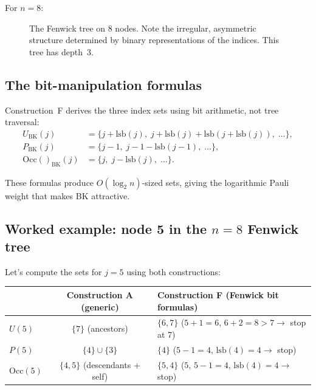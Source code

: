 \documentclass[11pt,a4paper]{article}
\newcommand{\Occ}[1]{\mathrm{Occ}(#1)}
\theoremstyle{definition}
\begin{document}
For $n = 8$:

\begin{figure}[h]
\centering
{}
\caption{The Fenwick tree on 8 nodes.  Note the irregular, asymmetric
structure determined by binary representations of the indices.
This tree has depth~3.}
\label{fig:fenwick-tree}
\end{figure}

\subsection{The bit-manipulation formulas}

Construction~F derives the three index sets using bit arithmetic, not
tree traversal:
\begin{align*}
  U_\text{BK}(j) &= \{j + \mathrm{lsb}(j),\;
    j + \mathrm{lsb}(j) + \mathrm{lsb}(j + \mathrm{lsb}(j)),\;
    \ldots\}, \\
  P_\text{BK}(j) &= \{j - 1,\;
    j - 1 - \mathrm{lsb}(j - 1),\; \ldots\}, \\
  \Occ{}_\text{BK}(j) &= \{j,\;
    j - \mathrm{lsb}(j),\; \ldots\}.
\end{align*}

These formulas produce $O(\log_2 n)$-sized sets, giving the
logarithmic Pauli weight that makes BK attractive.

\subsection{Worked example: node 5 in the $n = 8$ Fenwick tree}

Let's compute the sets for $j = 5$ using both constructions:

\begin{center}
\begin{tabular}{@{}lcl@{}}
\toprule
& \textbf{Construction A} (generic) &
  \textbf{Construction F} (Fenwick bit formulas) \\
\midrule
$U(5)$ & $\{7\}$ (ancestors) &
  $\{6, 7\}$ ($5 + 1 = 6$, $6 + 2 = 8 > 7 \to$ stop at 7) \\
$P(5)$ & $\{4\} \cup \{3\}$ &
  $\{4\}$ ($5 - 1 = 4$, $\mathrm{lsb}(4) = 4 \to$ stop) \\
$\Occ{5}$ & $\{4, 5\}$ (descendants + self) &
  $\{5, 4\}$ ($5$, $5 - 1 = 4$, $\mathrm{lsb}(4) = 4 \to$ stop) \\
\bottomrule
\end{tabular}
\end{center}
\end{document}
